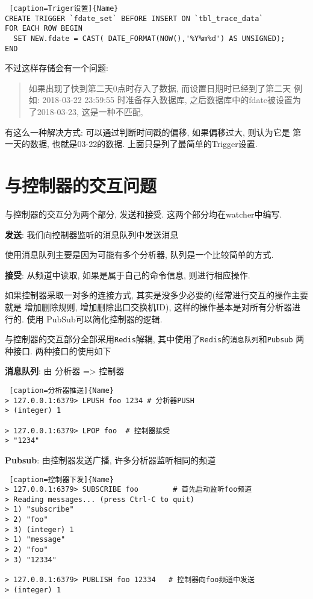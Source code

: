 \begin{lstlisting} [caption=Triger设置]{Name}
CREATE TRIGGER `fdate_set` BEFORE INSERT ON `tbl_trace_data`
FOR EACH ROW BEGIN
  SET NEW.fdate = CAST( DATE_FORMAT(NOW(),'%Y%m%d') AS UNSIGNED);
END
\end{lstlisting}


不过这样存储会有一个问题:

\begin{quote}
如果出现了快到第二天0点时存入了数据, 而设置日期时已经到了第二天 例如:
2018-03-22 23:59:55 时准备存入数据库,
之后数据库中的fdate被设置为了2018-03-23, 这是一种不匹配,
\end{quote}

有这么一种解决方式: 可以通过判断时间戳的偏移, 如果偏移过大, 则认为它是
第一天的数据, 也就是03-22的数据. 上面只是列了最简单的Trigger设置.

\section{与控制器的交互问题}

与控制器的交互分为两个部分, 发送和接受. 这两个部分均在watcher中编写.

\textbf{发送}: 我们向控制器监听的消息队列中发送消息

使用消息队列主要是因为可能有多个分析器, 队列是一个比较简单的方式.

\textbf{接受}: 从频道中读取, 如果是属于自己的命令信息, 则进行相应操作.

如果控制器采取一对多的连接方式,
其实是没多少必要的(经常进行交互的操作主要就是 增加删除规则,
增加删除出口交换机ID), 这样的操作基本是对所有分析器进行的. 使用
PubSub可以简化控制器的逻辑.

与控制器的交互部分全部采用\texttt{Redis}解耦,
其中使用了\texttt{Redis}的\texttt{消息队列}和\texttt{Pubsub} 两种接口.
两种接口的使用如下

\textbf{消息队列}: 由 分析器 =\textgreater{} 控制器

\begin{lstlisting} [caption=分析器推送]{Name}
> 127.0.0.1:6379> LPUSH foo 1234 # 分析器PUSH
> (integer) 1

> 127.0.0.1:6379> LPOP foo  # 控制器接受
> "1234"
\end{lstlisting}

\textbf{Pubsub}: 由控制器发送广播, 许多分析器监听相同的频道


\begin{lstlisting} [caption=控制器下发]{Name}
> 127.0.0.1:6379> SUBSCRIBE foo        # 首先启动监听foo频道 
> Reading messages... (press Ctrl-C to quit)
> 1) "subscribe"
> 2) "foo"
> 3) (integer) 1
> 1) "message"
> 2) "foo"
> 3) "12334"

> 127.0.0.1:6379> PUBLISH foo 12334   # 控制器向foo频道中发送
> (integer) 1
\end{lstlisting}

